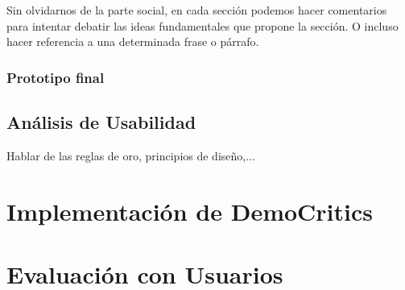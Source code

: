 Sin olvidarnos de la parte social, en cada sección podemos hacer comentarios para intentar debatir las ideas fundamentales que propone la sección. O incluso hacer referencia a una determinada frase o párrafo.

\subsubsection{Prototipo final}

\subsection{Análisis de Usabilidad}

Hablar de las reglas de oro, principios de diseño,...

\section{Implementación de DemoCritics}

\section{Evaluación con Usuarios}


